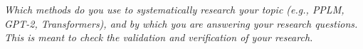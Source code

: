 \textit{Which methods do you use to systematically research your topic (e.g., PPLM, GPT-2, Transformers), and by which you are answering your research questions. This is meant to check the validation and verification of your research.}
